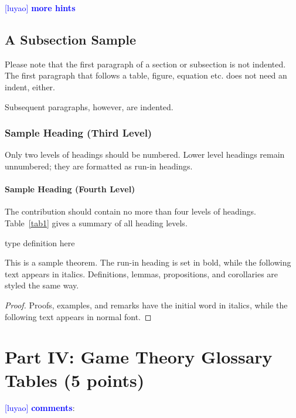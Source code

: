 \documentclass[runningheads]{llncs}
\newcommand{\luyao}[1]{\textcolor{blue}{[luyao] #1}}
\newcommand{\luyao}[1]{}
\begin{document}
\newpage
\noindent\luyao{\textbf{more hints}}
\subsection{A Subsection Sample}
Please note that the first paragraph of a section or subsection is
not indented. The first paragraph that follows a table, figure,
equation etc. does not need an indent, either.

Subsequent paragraphs, however, are indented.

\subsubsection{Sample Heading (Third Level)} Only two levels of
headings should be numbered. Lower level headings remain unnumbered;
they are formatted as run-in headings.

\paragraph{Sample Heading (Fourth Level)}
The contribution should contain no more than four levels of
headings. Table~\ref{tab1} gives a summary of all heading levels.

\begin{definition}
type definition here
\end{definition}

\begin{theorem}
This is a sample theorem. The run-in heading is set in bold, while
the following text appears in italics. Definitions, lemmas,
propositions, and corollaries are styled the same way.
\end{theorem}
%
%
\begin{proof}
Proofs, examples, and remarks have the initial word in italics,
while the following text appears in normal font.
\end{proof}



\section{Part IV: Game Theory Glossary Tables (5 points)}
\luyao{\textbf{comments}}:
\end{document}
